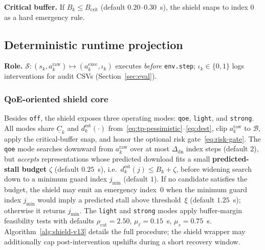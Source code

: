 \documentclass[preprint,12pt,times]{elsarticle}
\begin{document}
\textbf{Critical buffer.} If \(B_k\le B_{\mathrm{crit}}\) (default \(0.20\)--\(0.30\)~s), the shield snaps to index \(0\) as a hard emergency rule.

\subsection{Deterministic runtime projection}\label{sec:method:shield}

\textbf{Role.} \(\mathcal{S}:(s_k,a^{\mathrm{raw}}_k)\mapsto(a^{\mathrm{exec}}_k,\iota_k)\) executes \emph{before} \texttt{env.step}; \(\iota_k\in\{0,1\}\) logs interventions for audit CSVs (Section~\ref{sec:eval}).

\subsubsection{QoE-oriented shield core}\label{sec:method:shield:v13}

Besides \texttt{off}, the shield exposes three operating modes: \texttt{qoe}, \texttt{light}, and \texttt{strong}.
All modes share \(\underline{C}_k\) and \(d^{\mathrm{est}}_k(\cdot)\) from~\eqref{eq:tp-pessimistic}--\eqref{eq:dest}, clip \(a^{\mathrm{raw}}_k\) to \(\mathcal{B}\), apply the critical-buffer snap, and honor the optional risk gate~\eqref{eq:risk-gate}.
The \texttt{qoe} mode searches downward from \(a^{\mathrm{raw}}_k\) over at most \(\Delta_{\mathrm{dn}}\) index steps (default \(2\)), but \emph{accepts} representations whose predicted download fits a small \textbf{predicted-stall budget} \(\zeta\) (default \(0.25\)~s), i.e.\ \(d^{\mathrm{est}}_k(j)\le B_k+\zeta\), before widening search down to a minimum guard index \(j_{\min}\) (default \(1\)).
If no candidate satisfies the budget, the shield may emit an emergency index~\(0\) when the minimum guard index \(j_{\min}\) would imply a predicted stall above threshold~\(\xi\) (default \(1.25\)~s); otherwise it returns \(j_{\min}\).
The \texttt{light} and \texttt{strong} modes apply buffer-margin feasibility tests with defaults \(\rho_{\mathrm{cat}}{=}2.50\), \(\mu_{\ell}{=}0.15\)~s, \(\mu_s{=}0.75\)~s.
Algorithm~\ref{alg:shield-v13} details the full procedure; the shield wrapper may additionally cap post-intervention upshifts during a short recovery window.
\end{document}
